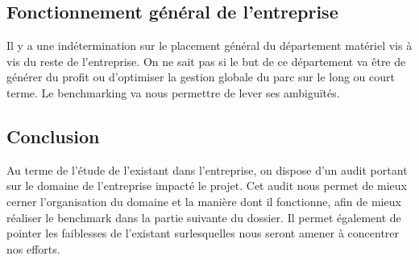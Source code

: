 \subsection{Fonctionnement général de l'entreprise}

Il y a une indétermination sur le placement général du département matériel 
vis à vis du reste de l'entreprise. On ne sait pas si le but de ce département
va être de générer du profit ou d'optimiser la gestion globale du parc sur le long
ou court terme. Le benchmarking va nous permettre de lever ses ambiguïtés.

\subsection{Conclusion}
Au terme de l'étude de l'existant dans l'entreprise, on dispose d'un audit
portant sur le domaine de l'entreprise impacté le projet. Cet audit nous
permet de mieux cerner l'organisation du domaine et la manière dont il
fonctionne, afin de mieux réaliser le benchmark dans la partie suivante du
dossier. Il permet également de pointer les faiblesses de l'existant
surlesquelles nous seront amener à concentrer nos efforts.
